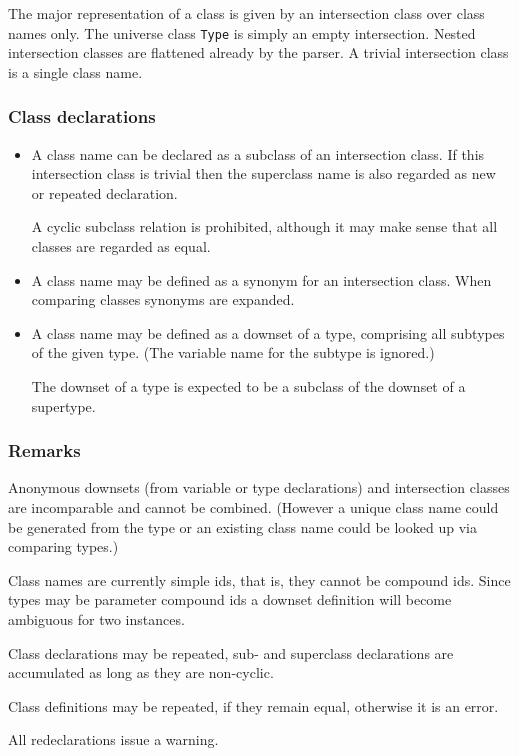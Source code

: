 \documentclass{article}
\begin{document}
The major representation of a class is given by an intersection class over
class names only. The universe class \texttt{Type} is simply an empty
intersection. Nested intersection classes are flattened already by the
parser. A trivial intersection class is a single class name.

\subsubsection*{Class declarations}
\begin{itemize}
\item A class name can be declared as a subclass of an intersection class. If
  this intersection class is trivial then the superclass name is also regarded
  as new or repeated declaration.
  
  A cyclic subclass relation is prohibited, although it may make sense
  that all classes are regarded as equal.
\item A class name may be defined as a synonym for an intersection class. 
  When comparing classes synonyms are expanded.
\item A class name may be defined as a downset of a type, comprising all
  subtypes of the given type. (The variable name for the subtype is ignored.)
  
  The downset of a type is expected to be a subclass of the downset of a
  supertype.
\end{itemize}

\subsubsection*{Remarks}

Anonymous downsets (from variable or type declarations) and intersection
classes are incomparable and cannot be combined. (However a unique class name
could be generated from the type or an existing class name could be looked up
via comparing types.)

Class names are currently simple ids, that is, they cannot be compound ids.
Since types may be parameter compound ids a downset definition will become
ambiguous for two instances.

Class declarations may be repeated, sub- and superclass declarations are
accumulated as long as they are non-cyclic.

Class definitions may be repeated, if they remain equal, otherwise it is an
error.

All redeclarations issue a warning. 
\end{document}
